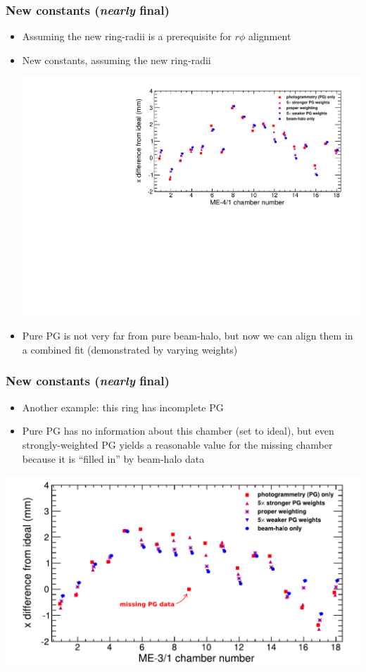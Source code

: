 \documentclass[compress]{beamer}
\begin{document}
\begin{frame}
\frametitle{New constants ({\it nearly} final)}

\begin{itemize}
\item Assuming the new ring-radii is a prerequisite for $r\phi$ alignment

\item New constants, assuming the new ring-radii

\includegraphics[width=\linewidth]{dependence_on_weights_41.pdf}

\item Pure PG is not very far from pure beam-halo, but now we can
  align them in a combined fit (demonstrated by varying weights)
\end{itemize}
\end{frame}

\begin{frame}
\frametitle{New constants ({\it nearly} final)}

\begin{itemize}
\item Another example: this ring has incomplete PG
\item Pure PG has no information about this chamber (set to ideal),
  but even strongly-weighted PG yields a reasonable value for the missing
  chamber because it is ``filled in'' by beam-halo data
\end{itemize}

\includegraphics[width=\linewidth]{dependence_on_weights_31.pdf}
\end{frame}
\end{document}
